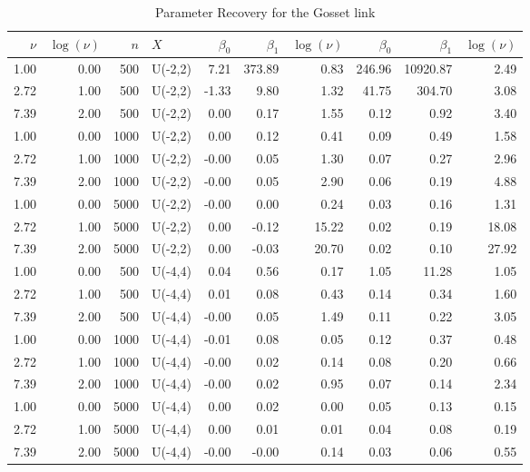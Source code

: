 \begin{table}[ht]
\begin{center}
\caption{Parameter Recovery for the Gosset link}
\label{gossettable}
\begin{tabular}{rrrlrrrrrr}
  \toprule
$\nu$ & $\log(\nu)$ & $n$ & $X$ & $  \beta_0$ &   $\beta_1$ &   $\log(\nu)$ & $   \beta_0$ &    $\beta_1$ &    $\log(\nu)$ \\ 
  \midrule
1.00 & 0.00 & 500 & U(-2,2) & 7.21 & 373.89 & 0.83 & 246.96 & 10920.87 & 2.49 \\ 
  2.72 & 1.00 & 500 & U(-2,2) & -1.33 & 9.80 & 1.32 & 41.75 & 304.70 & 3.08 \\ 
  7.39 & 2.00 & 500 & U(-2,2) & 0.00 & 0.17 & 1.55 & 0.12 & 0.92 & 3.40 \\ 
  1.00 & 0.00 & 1000 & U(-2,2) & 0.00 & 0.12 & 0.41 & 0.09 & 0.49 & 1.58 \\ 
  2.72 & 1.00 & 1000 & U(-2,2) & -0.00 & 0.05 & 1.30 & 0.07 & 0.27 & 2.96 \\ 
  7.39 & 2.00 & 1000 & U(-2,2) & -0.00 & 0.05 & 2.90 & 0.06 & 0.19 & 4.88 \\ 
  1.00 & 0.00 & 5000 & U(-2,2) & -0.00 & 0.00 & 0.24 & 0.03 & 0.16 & 1.31 \\ 
  2.72 & 1.00 & 5000 & U(-2,2) & 0.00 & -0.12 & 15.22 & 0.02 & 0.19 & 18.08 \\ 
  7.39 & 2.00 & 5000 & U(-2,2) & 0.00 & -0.03 & 20.70 & 0.02 & 0.10 & 27.92 \\ 
  1.00 & 0.00 & 500 & U(-4,4) & 0.04 & 0.56 & 0.17 & 1.05 & 11.28 & 1.05 \\ 
  2.72 & 1.00 & 500 & U(-4,4) & 0.01 & 0.08 & 0.43 & 0.14 & 0.34 & 1.60 \\ 
  7.39 & 2.00 & 500 & U(-4,4) & -0.00 & 0.05 & 1.49 & 0.11 & 0.22 & 3.05 \\ 
  1.00 & 0.00 & 1000 & U(-4,4) & -0.01 & 0.08 & 0.05 & 0.12 & 0.37 & 0.48 \\ 
  2.72 & 1.00 & 1000 & U(-4,4) & -0.00 & 0.02 & 0.14 & 0.08 & 0.20 & 0.66 \\ 
  7.39 & 2.00 & 1000 & U(-4,4) & -0.00 & 0.02 & 0.95 & 0.07 & 0.14 & 2.34 \\ 
  1.00 & 0.00 & 5000 & U(-4,4) & 0.00 & 0.02 & 0.00 & 0.05 & 0.13 & 0.15 \\ 
  2.72 & 1.00 & 5000 & U(-4,4) & 0.00 & 0.01 & 0.01 & 0.04 & 0.08 & 0.19 \\ 
  7.39 & 2.00 & 5000 & U(-4,4) & -0.00 & -0.00 & 0.14 & 0.03 & 0.06 & 0.55 \\ 
   \bottomrule
\end{tabular}
\end{center}
\end{table}
